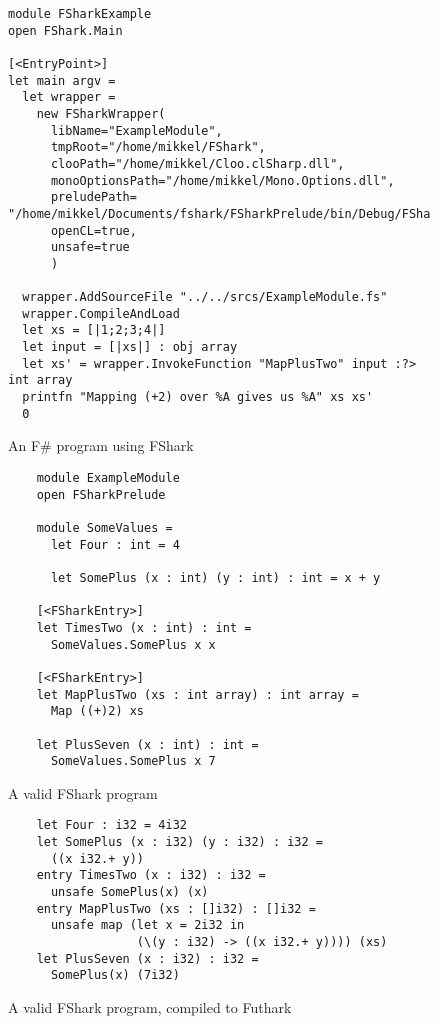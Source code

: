 \begin{figure}
  \centering
    \begin{verbatim}
module FSharkExample
open FShark.Main

[<EntryPoint>]
let main argv =
  let wrapper = 
    new FSharkWrapper(
      libName="ExampleModule",
      tmpRoot="/home/mikkel/FShark",
      clooPath="/home/mikkel/Cloo.clSharp.dll",
      monoOptionsPath="/home/mikkel/Mono.Options.dll",
      preludePath= "/home/mikkel/Documents/fshark/FSharkPrelude/bin/Debug/FSharkPrelude.dll",
      openCL=true,
      unsafe=true
      )

  wrapper.AddSourceFile "../../srcs/ExampleModule.fs"
  wrapper.CompileAndLoad
  let xs = [|1;2;3;4|]
  let input = [|xs|] : obj array
  let xs' = wrapper.InvokeFunction "MapPlusTwo" input :?> int array
  printfn "Mapping (+2) over %A gives us %A" xs xs'
  0
    \end{verbatim}
  \caption{An F\# program using FShark}
  \label{fig:fsharkusageexample}
\end{figure}

\begin{figure}
  \centering
  \begin{verbatim}
    module ExampleModule
    open FSharkPrelude

    module SomeValues =
      let Four : int = 4

      let SomePlus (x : int) (y : int) : int = x + y

    [<FSharkEntry>]
    let TimesTwo (x : int) : int =
      SomeValues.SomePlus x x
  
    [<FSharkEntry>]
    let MapPlusTwo (xs : int array) : int array =
      Map ((+)2) xs

    let PlusSeven (x : int) : int =
      SomeValues.SomePlus x 7
  \end{verbatim}
  \caption{A valid FShark program}
  \label{fig:validfsharkprogram}
\end{figure}

\begin{figure}
  \centering
  \begin{verbatim}
    let Four : i32 = 4i32
    let SomePlus (x : i32) (y : i32) : i32 =
      ((x i32.+ y))
    entry TimesTwo (x : i32) : i32 =
      unsafe SomePlus(x) (x)
    entry MapPlusTwo (xs : []i32) : []i32 =
      unsafe map (let x = 2i32 in
                  (\(y : i32) -> ((x i32.+ y)))) (xs)
    let PlusSeven (x : i32) : i32 =
      SomePlus(x) (7i32)
      \end{verbatim}
  \caption{A valid FShark program, compiled to Futhark}
  \label{fig:validfsharkprogramresult}
\end{figure}

